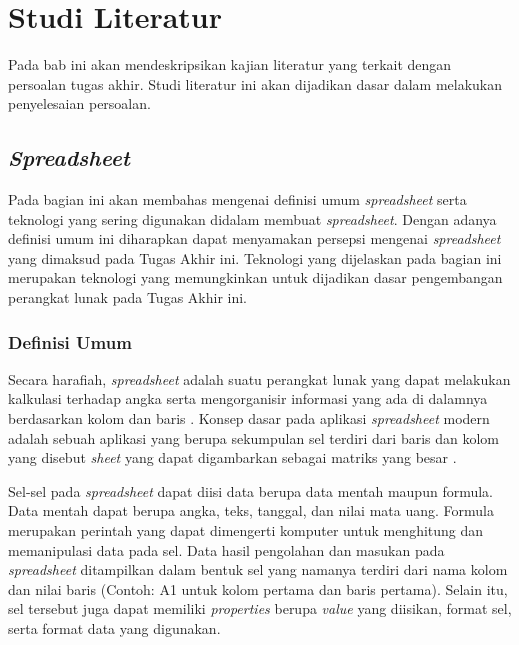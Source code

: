 \chapter{Studi Literatur}

Pada bab ini akan mendeskripsikan kajian literatur yang terkait dengan persoalan tugas akhir. Studi literatur ini akan dijadikan dasar dalam melakukan penyelesaian persoalan.

\section{\textit{Spreadsheet}}
Pada bagian ini akan membahas mengenai definisi umum \textit{spreadsheet} serta teknologi yang sering digunakan didalam membuat \textit{spreadsheet}. Dengan adanya definisi umum ini diharapkan dapat menyamakan persepsi mengenai \textit{spreadsheet} yang dimaksud pada Tugas Akhir ini. Teknologi yang dijelaskan pada bagian ini merupakan teknologi yang memungkinkan untuk dijadikan dasar pengembangan perangkat lunak pada Tugas Akhir ini.

\subsection{Definisi Umum}
Secara harafiah, \textit{spreadsheet} adalah suatu perangkat lunak yang dapat melakukan kalkulasi terhadap angka serta mengorganisir informasi yang ada di dalamnya berdasarkan kolom dan baris \citep{meriamwebster-spreadsheet}. Konsep dasar pada aplikasi \textit{spreadsheet} modern adalah sebuah aplikasi yang berupa sekumpulan sel terdiri dari baris dan kolom yang disebut \textit{sheet} yang dapat digambarkan sebagai matriks yang besar \citep{Ronen1989}.

Sel-sel pada \textit{spreadsheet} dapat diisi data berupa data mentah maupun formula. Data mentah dapat berupa angka, teks, tanggal, dan nilai mata uang. Formula merupakan perintah yang dapat dimengerti komputer untuk menghitung dan memanipulasi data pada sel. Data hasil pengolahan dan masukan pada \textit{spreadsheet} ditampilkan dalam bentuk sel yang namanya terdiri dari nama kolom dan nilai baris (Contoh: A1 untuk kolom pertama dan baris pertama). Selain itu, sel tersebut juga dapat memiliki \textit{properties} berupa \textit{value} yang diisikan, format sel, serta format data yang digunakan.

